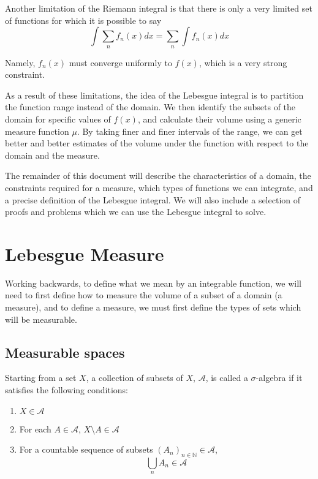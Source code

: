 \documentclass{article}
\begin{document}
Another limitation of the Riemann integral is that there is only a very limited set of
functions for which  it is possible to say 
\[\int \sum_n f_n(x) dx = \sum_n \int f_n(x) dx \]

Namely, $f_n(x)$ must converge uniformly to $f(x)$, which is a very strong constraint.

As a result of these limitations, the idea of the Lebesgue integral is to partition
the function range instead of the domain. We then identify the subsets of the domain for
specific values of $f(x)$, and calculate their volume using a generic measure function
$\mu$. By taking finer and finer intervals of the range, we can get better and better 
estimates of the volume under the function with respect to the domain and the measure.

The remainder of this document will describe the characteristics of a domain, the
constraints required for a measure, which types of functions we can integrate, and
a precise definition of the Lebesgue integral. We will also include a selection of
proofs and problems which we can use the Lebesgue integral to solve.

\section{Lebesgue Measure}

Working backwards, to define what we mean by an integrable function, we will need to
first define how to measure the volume of a subset of a domain (a measure), and to
define a measure, we must first define the types of sets which will be measurable.

\subsection{Measurable spaces}

Starting from a set $X$, a collection of subsets of $X$, $\mathcal{A}$, is called a
$\sigma$-algebra if it satisfies the following conditions:

\begin{enumerate}
		\item $X \in \mathcal{A}$
		\item For each $A \in \mathcal{A}$, $X \setminus A \in \mathcal{A}$
		\item For a countable sequence of subsets $(A_n)_{n \in \mathbb{N}} \in \mathcal{A}$,
			\[\bigcup_{n} A_n \in \mathcal{A} \]
\end{enumerate}
\end{document}
